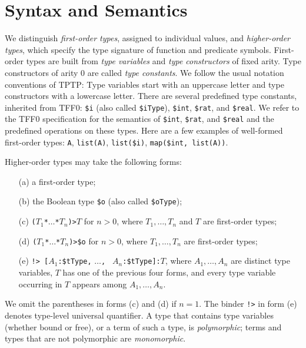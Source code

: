 \section{Syntax and Semantics} \label{sec_logic}

We distinguish {\em first-order types}, assigned
to individual values, and {\em higher-order types\/},
which specify the type signature of function and predicate symbols.
%
First-order types are built from {\em type variables\/}
and {\em type constructors\/} of fixed arity. Type constructors
of arity 0 are called {\em type constants}. We follow the usual
notation conventions of TPTP: Type variables start with an
uppercase letter and type constructors with a lowercase letter.
There are several predefined type constants, inherited from TFF0:
\verb+$i+ (also called \verb+$iType+),
\verb+$int+, \verb+$rat+, and \verb+$real+. We refer to the TFF0
specification \cite{TFF0} for the semantics of
\verb+$int+, \verb+$rat+, and \verb+$real+ and the predefined operations on
these types. %
Here are a few examples of well-formed first-order types:
\verb+A+, \verb+list(A)+, \verb+list($i)+, \verb+map($int,+~\verb+list(A))+.

Higher-order types may take the following forms:
%
\begin{enumerate}
\item[(a)] a first-order type;
\item[(b)] the Boolean type \verb+$o+ (also called \verb+$oType+);
\item[(c)] {\tt ($T_1$\;*\;${\dots}$\;*\;$T_n$)\;>\;$T$} for $n > 0$,
where $T_1,\dots,T_n$ and $T$ are first-order types;
\item[(d)] {\tt ($T_1$\;*\;${\dots}$\;*\;$T_n$)\;>\;\$o} for $n > 0$,
where $T_1,\dots,T_n$ are first-order types;
\item[(e)] {\tt !>\ [$A_1$\;:\;\$tType,} {\tt ${\dots}$,} {\tt
$A_n$\;:\;\$tType]:\;$T$}, where $A_1,\dots,A_n$ are distinct type variables, $T$
has one of the previous four forms, and every type variable occurring in $T$
appears among $A_1,\dots,A_n$.
\end{enumerate}
%
We omit the parentheses in forms (c) and (d) if $n = 1$. The binder {\tt !>} in
form (e) denotes type-level universal quantifier.
A type that contains type variables (whether bound or free), or a term of such a
type, is {\em polymorphic}; terms and types that are not polymorphic are {\em
monomorphic}.

